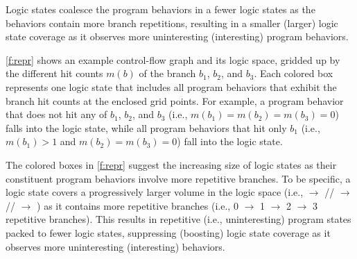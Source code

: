 \documentclass[letterpaper,twocolumn,10pt]{article}
\begin{document}
Logic states coalesce the program behaviors in a fewer logic states as the
behaviors contain more branch repetitions, resulting in a smaller (larger)
logic state coverage as it observes more uninteresting (interesting) program
behaviors.


\autoref{f:repr} shows an example control-flow graph and its logic space,
gridded up by the different hit counts $m(b)$ of the branch $b_1$, $b_2$, and $b_3$.
Each colored box represents one logic state that includes all program
behaviors that exhibit the branch hit counts at the enclosed grid points.
For example, a program behavior that does not hit any of $b_1$, $b_2$, and $b_3$ 
(i.e., $m(b_1)=m(b_2)=m(b_3)=0$) falls into the  logic state, while
all program behaviors that hit only $b_1$ (i.e., $m(b_1)>1$ and
$m(b_2)=m(b_3)=0$) fall into the  logic state.

The colored boxes in \autoref{f:repr} suggest the increasing size of logic
states as their constituent program behaviors involve more repetitive branches.
To be specific, a logic state covers a progressively larger volume in the logic
space (i.e.,  $\rightarrow$ //
$\rightarrow$ // $\rightarrow$
) as it contains more repetitive branches (i.e., 0 $\rightarrow$ 1
$\rightarrow$ 2 $\rightarrow$ 3 repetitive branches). 
%
This results in repetitive (i.e., uninteresting) program states packed
to fewer logic states, suppressing (boosting) logic state coverage as it observes more
uninteresting (interesting) behaviors.

\end{document}
